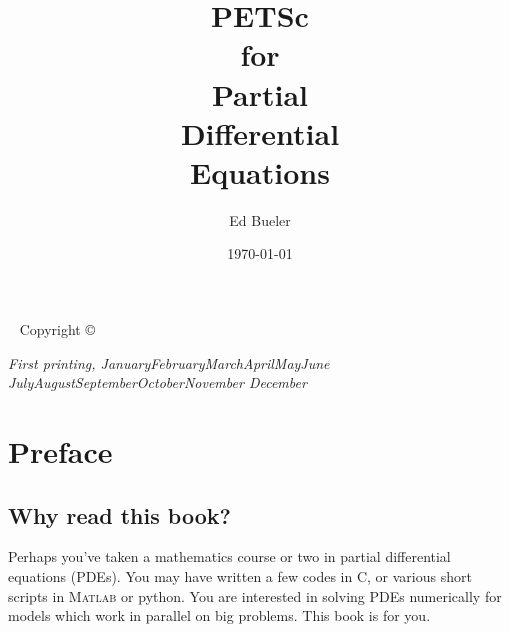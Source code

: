 \documentclass{tufte-book}
\title[PETSc for PDEs]{PETSc \\ for \\ Partial \\ Differential \\ Equations}
\author{Ed Bueler}
\date{\today}
\theoremstyle{definition}
\newcommand{\openepigraph}[2]{%
  \begin{fullwidth}
  \sffamily\large
  \begin{doublespace}
  \noindent\allcaps{#1}\\%
  \noindent \Large \allcaps{#2}%
  \end{doublespace}
  \end{fullwidth}
}
\newcommand{\monthyear}{%
  \ifcase\month\or January\or February\or March\or April\or May\or June\or
  July\or August\or September\or October\or November\or
  December\fi\space\number\year
}
\newcommand{\Matlab}{\textsc{Matlab}\xspace}
\begin{document}
\begin{comment}
\newpage\thispagestyle{empty}
\openepigraph{%
\dots when there are disputes among persons, we can simply say: Let us calculate, without further ado, to see who is right.
}{Gottfried Wilhelm Leibniz}
\vfill
\openepigraph{%
Developing parallel, nontrivial PDE solvers that deliver high performance is still difficult and requires months (or even years) of concentrated effort.  PETSc is a toolkit that can ease these difficulties and reduce the development time, but it is not a black-box PDE solver, nor a silver bullet
}{Barry Smith}
\vfill
\openepigraph{%
Tufte's style is known for its extensive use of sidenotes, tight integration of graphics with text, and well-set typography.
}{The Tufte-LaTeX\ Developers}
\vfill

\frontmatter
\end{comment}

\maketitle


\newpage
\begin{fullwidth}
~\vfill
\thispagestyle{empty}
\setlength{\parindent}{0pt}
\setlength{\parskip}{\baselineskip}
Copyright \copyright\ \the\year\ \thanklessauthor

\par{}


\par\textit{First printing, \monthyear}
\end{fullwidth}

\tableofcontents




\chapter*{Preface}

\section{Why read this book?}

Perhaps you've taken a mathematics course or two in partial differential equations (PDEs).  You may have written a few codes in C, or various short scripts in \Matlab or python.  You are interested in solving PDEs numerically for models which work in parallel on big problems.  This book is for you.
\end{document}
